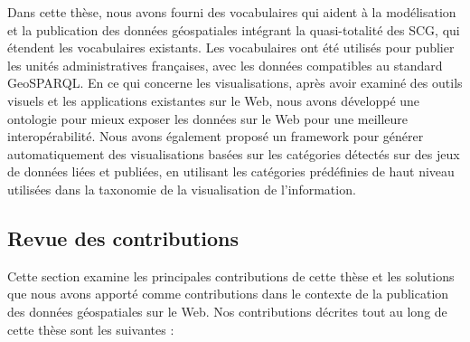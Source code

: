 Dans cette th\`{e}se, nous avons fourni des vocabulaires qui aident à la mod\'{e}lisation et la publication des donn\'{e}es g\'{e}ospatiales int\'{e}grant la quasi-totalit\'{e} des SCG, qui \'{e}tendent les vocabulaires existants. Les vocabulaires ont \'{e}t\'{e} utilis\'{e}s pour publier les unit\'{e}s administratives françaises, avec les donn\'{e}es compatibles au standard GeoSPARQL. En ce qui concerne les visualisations, apr\`{e}s avoir examin\'{e} des outils visuels et les applications existantes sur le Web, nous avons d\'{e}velopp\'{e} une ontologie pour mieux exposer les donn\'{e}es sur le Web pour une meilleure interop\'{e}rabilit\'{e}. Nous avons \'{e}galement propos\'{e} un framework pour g\'{e}n\'{e}rer automatiquement des visualisations bas\'{e}es sur les cat\'{e}gories d\'{e}tect\'{e}s sur des jeux de donn\'{e}es li\'{e}es et publi\'{e}es, en utilisant les cat\'{e}gories pr\'{e}d\'{e}finies de haut niveau utilis\'{e}es dans la taxonomie de la visualisation de l'information.

\subsection*{Revue des contributions}
Cette section examine les principales contributions de cette th\`{e}se et les solutions que nous avons apport\'{e} comme contributions dans le contexte de la publication des donn\'{e}es g\'{e}ospatiales sur le Web. Nos contributions d\'{e}crites tout au long de cette th\`{e}se sont les suivantes :

